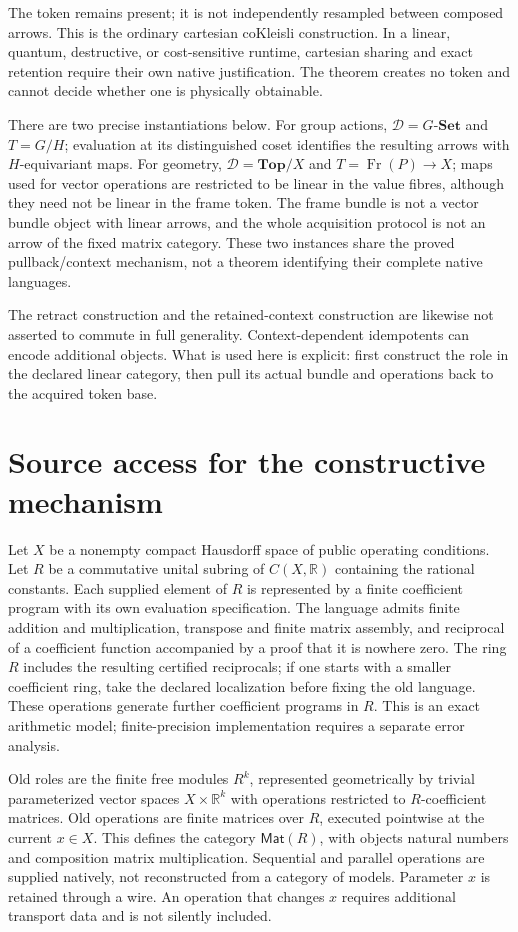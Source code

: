 \documentclass[11pt]{article}
\theoremstyle{definition}
\theoremstyle{remark}
\newcommand{\R}{\mathbb R}
\newcommand{\Set}{\mathbf{Set}}
\newcommand{\Mat}{\mathsf{Mat}}
\newcommand{\Fr}{\operatorname{Fr}}
\begin{document}
The token remains present; it is not independently resampled between composed arrows. This is the ordinary cartesian coKleisli construction. In a linear, quantum, destructive, or cost-sensitive runtime, cartesian sharing and exact retention require their own native justification. The theorem creates no token and cannot decide whether one is physically obtainable.

There are two precise instantiations below. For group actions, $\mathcal D=G\text{-}\Set$ and $T=G/H$; evaluation at its distinguished coset identifies the resulting arrows with $H$-equivariant maps. For geometry, $\mathcal D=\mathbf{Top}/X$ and $T=\Fr(P)\to X$; maps used for vector operations are restricted to be linear in the value fibres, although they need not be linear in the frame token. The frame bundle is not a vector bundle object with linear arrows, and the whole acquisition protocol is not an arrow of the fixed matrix category. These two instances share the proved pullback/context mechanism, not a theorem identifying their complete native languages.

The retract construction and the retained-context construction are likewise not asserted to commute in full generality. Context-dependent idempotents can encode additional objects. What is used here is explicit: first construct the role in the declared linear category, then pull its actual bundle and operations back to the acquired token base.

\section{Source access for the constructive mechanism}\label{sec:source}
Let $X$ be a nonempty compact Hausdorff space of public operating conditions. Let $R$ be a commutative unital subring of $C(X,\R)$ containing the rational constants. Each supplied element of $R$ is represented by a finite coefficient program with its own evaluation specification. The language admits finite addition and multiplication, transpose and finite matrix assembly, and reciprocal of a coefficient function accompanied by a proof that it is nowhere zero. The ring $R$ includes the resulting certified reciprocals; if one starts with a smaller coefficient ring, take the declared localization before fixing the old language. These operations generate further coefficient programs in $R$. This is an exact arithmetic model; finite-precision implementation requires a separate error analysis.

Old roles are the finite free modules $R^k$, represented geometrically by trivial parameterized vector spaces $X\times\R^k$ with operations restricted to $R$-coefficient matrices. Old operations are finite matrices over $R$, executed pointwise at the current $x\in X$. This defines the category $\Mat(R)$, with objects natural numbers and composition matrix multiplication. Sequential and parallel operations are supplied natively, not reconstructed from a category of models. Parameter $x$ is retained through a wire. An operation that changes $x$ requires additional transport data and is not silently included.
\end{document}
